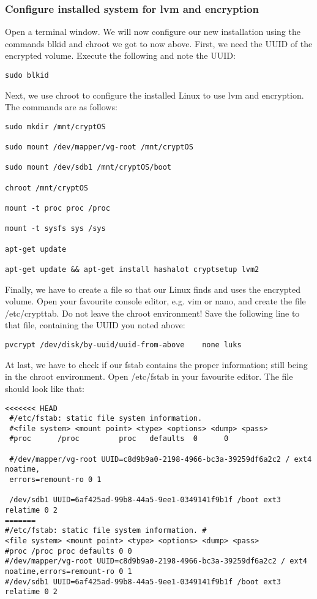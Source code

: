 \documentclass[12pt,a4paper]{article}
\begin{document}
\subsubsection{Configure installed system for lvm and encryption}
Open a terminal window. We will now configure our new installation using the commands blkid and chroot we got to now above. First, we need the UUID of the encrypted volume. Execute the following and note the UUID:
\begin{Verbatim}[commandchars=\\\{\}]
sudo blkid
\end{Verbatim}
Next, we use chroot to configure the installed Linux to use lvm and encryption. The commands are as follows:
\begin{Verbatim}[commandchars=\\\{\}]
sudo mkdir /mnt/cryptOS

sudo mount /dev/mapper/vg-root /mnt/cryptOS

sudo mount /dev/sdb1 /mnt/cryptOS/boot

chroot /mnt/cryptOS

mount -t proc proc /proc

mount -t sysfs sys /sys

apt-get update

apt-get update && apt-get install hashalot cryptsetup lvm2
\end{Verbatim}
Finally, we have to create a file so that our Linux finds and uses the encrypted volume. Open your favourite console editor, e.g. vim or nano, and create the file /etc/crypttab. Do not leave the chroot environment! Save the following line to that file, containing the UUID you noted above:
\begin{Verbatim}[commandchars=\\\{\}]
pvcrypt /dev/disk/by-uuid/uuid-from-above	 none luks
\end{Verbatim}
At last, we have to check if our fstab contains the proper information; still being in the chroot environment. Open /etc/fstab in your favourite editor. The file should look like that:
\begin{Verbatim}[commandchars=\\\{\}]
<<<<<<< HEAD
 #/etc/fstab: static file system information. 
 #<file system> <mount point> <type> <options> <dump> <pass>	
 #proc		/proc	      proc   defaults  0      0
 	
 #/dev/mapper/vg-root UUID=c8d9b9a0-2198-4966-bc3a-39259df6a2c2 / ext4 noatime,
 errors=remount-ro 0 1
 
 /dev/sdb1 UUID=6af425ad-99b8-44a5-9ee1-0349141f9b1f /boot ext3  relatime 0 2
=======
#/etc/fstab: static file system information. #
<file system> <mount point> <type> <options> <dump> <pass>	
#proc /proc proc defaults 0 0		
#/dev/mapper/vg-root UUID=c8d9b9a0-2198-4966-bc3a-39259df6a2c2 / ext4
noatime,errors=remount-ro 0 1  
#/dev/sdb1 UUID=6af425ad-99b8-44a5-9ee1-0349141f9b1f /boot ext3 relatime 0 2
\end{Verbatim}
\end{document}
